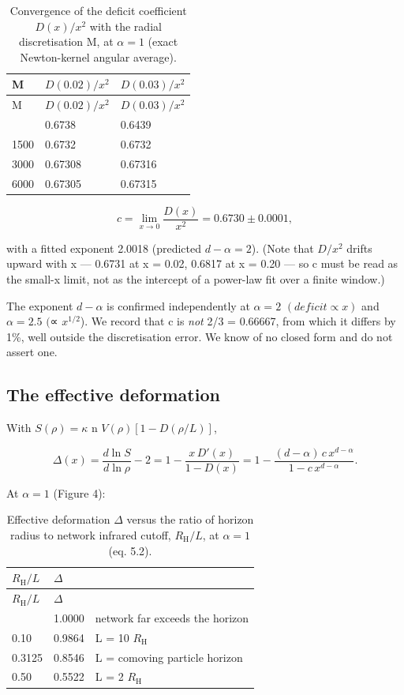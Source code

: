 \documentclass[12pt]{iopart}
\begin{document}
\begin{longtable}[]{@{}lll@{}}
\caption{Convergence of the deficit coefficient \(D(x)/x^{2}\) with the
radial discretisation M, at \(\alpha  = 1\) (exact Newton-kernel angular
average).}\tabularnewline
\toprule\noalign{}
M & \(D(0.02)/x^{2}\) & \(D(0.03)/x^{2}\) \\
\midrule\noalign{}
\endfirsthead
\toprule\noalign{}
M & \(D(0.02)/x^{2}\) & \(D(0.03)/x^{2}\) \\
\midrule\noalign{}
\endhead
\bottomrule\noalign{}
\endlastfoot
750 & 0.6738 & 0.6439 \\
1500 & 0.6732 & 0.6732 \\
3000 & 0.67308 & 0.67316 \\
6000 & 0.67305 & 0.67315 \\
\end{longtable}

\[c = \lim_{x\to0} \frac{D(x)}{x^2} = 0.6730 \pm 0.0001,\]

with a fitted exponent 2.0018 (predicted \(d - \alpha  = 2\)). (Note
that \(D/x^{2}\) drifts upward with x --- 0.6731 at x = 0.02, 0.6817 at
x = 0.20 --- so c must be read as the small-x limit, not as the
intercept of a power-law fit over a finite window.)

The exponent \(d - \alpha\) is confirmed independently at
\(\alpha  = 2\) \((deficit \propto  x)\) and \(\alpha  = 2.5\) \((\)∝
\(x^{1/2}\)). We record that c is \emph{not} 2/3 = 0.66667, from which
it differs by 1\%, well outside the discretisation error. We know of no
closed form and do not assert one.

\subsection{The effective deformation}\label{sec-5-2}

With \(S(\rho ) = \kappa\) n \(V(\rho )[1 - D(\rho /L)]\),

\[\Delta(x) = \frac{d\ln S}{d\ln\rho} - 2 = 1 - \frac{x\, D'(x)}{1 - D(x)} = 1 - \frac{(d-\alpha)\, c\, x^{d-\alpha}}{1 - c\, x^{d-\alpha}}. \tag{5.2}\]

At \(\alpha  = 1\) (Figure 4):

\begin{longtable}[]{@{}lll@{}}
\caption{Effective deformation \(\Delta\) versus the ratio of horizon
radius to network infrared cutoff, \(R_{\mathrm{H}}/L\), at
\(\alpha  = 1\) (eq. 5.2).}\tabularnewline
\toprule\noalign{}
\(R_{\mathrm{H}} / L\) & \(\Delta\) & \\
\midrule\noalign{}
\endfirsthead
\toprule\noalign{}
\(R_{\mathrm{H}} / L\) & \(\Delta\) & \\
\midrule\noalign{}
\endhead
\bottomrule\noalign{}
\endlastfoot
0.001 & 1.0000 & network far exceeds the horizon \\
0.10 & 0.9864 & L = 10 \(R_{\mathrm{H}}\) \\
0.3125 & 0.8546 & L = comoving particle horizon \\
0.50 & 0.5522 & L = 2 \(R_{\mathrm{H}}\) \\
\end{longtable}
\end{document}
